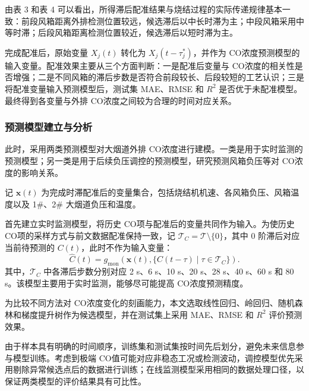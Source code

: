 \documentclass[UTF8,a4paper,zihao=-4]{ctexart}
\newcommand{\CO}{CO}
\begin{document}
由表 3 和表 4 可以看出，所得滞后配准结果与烧结过程的实际传递规律基本一致：前段风箱距离外排检测位置较远，候选滞后以中长时滞为主；中段风箱采用中等时滞；后段风箱距离检测位置较近，候选滞后以短时滞为主。

完成配准后，原始变量 $X_j(t)$ 转化为 $X_j(t-\tau_j^*)$，并作为 \CO 浓度预测模型的输入变量。配准效果主要从三个方面判断：一是配准后变量与 \CO 浓度的相关性是否增强；二是不同风箱的滞后步数是否符合前段较长、后段较短的工艺认识；三是将配准变量输入预测模型后，测试集 MAE、RMSE 和 $R^2$ 是否优于未配准模型。最终得到各变量与外排 \CO 浓度之间较为合理的时间对应关系\cite{openai2026codex}。

\subsubsection{预测模型建立与分析}

此时，采用两类预测模型对大烟道外排 \CO 浓度进行建模。一类是用于实时监测的预测模型；另一类是用于后续负压调控的预测模型，研究预测风箱负压等对 \CO 浓度的影响关系。

记 $\mathbf{x}(t)$ 为完成时滞配准后的变量集合，包括烧结机机速、各风箱负压、风箱温度以及 1\#、2\# 大烟道负压和温度。

首先建立实时监测模型，将历史 \CO 项与配准后的变量共同作为输入。为使历史 \CO 项的采样方式与前文数据配准保持一致，记
$\mathcal{T}_{C}=\mathcal{T}\setminus\{0\}$，其中 0 阶滞后对应当前待预测的 $C(t)$，此时不作为输入变量：
\begin{equation}
\hat C(t)
=
g_{\mathrm{mon}}
\left(
\mathbf{x}(t),\{C(t-\tau)\mid \tau\in\mathcal{T}_{C}\}
\right).
\end{equation}
其中，$\mathcal{T}_{C}$ 中各滞后步数分别对应 2 s、6 s、10 s、20 s、28 s、40 s、60 s 和 80 s。该模型主要用于实时监测，能够尽可能提高 \CO 浓度预测精度。

为比较不同方法对 \CO 浓度变化的刻画能力，本文选取线性回归、岭回归、随机森林和梯度提升树作为候选模型，并在测试集上采用 MAE、RMSE 和 $R^2$ 评价预测效果。

由于样本具有明确的时间顺序，训练集和测试集按时间先后划分，避免未来信息参与模型训练。考虑到极端 \CO 值可能对应非稳态工况或检测波动，调控模型优先采用剔除异常候选点后的数据进行训练；在线监测模型采用相同的数据处理口径，以保证两类模型的评价结果具有可比性。
\end{document}

